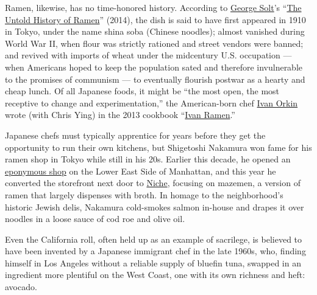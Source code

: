 Ramen, likewise, has no time-honored history. According to
\href{https://www.nytimes3xbfgragh.onion/2014/04/30/dining/an-indie-spirits-shop-a-history-book-on-ramen-real-baby-carrots-and-more.html}{George
Solt}'s
``\href{https://www.ucpress.edu/book/9780520282353/the-untold-history-of-ramen}{The
Untold History of Ramen}'' (2014), the dish is said to have first
appeared in 1910 in Tokyo, under the name shina soba (Chinese noodles);
almost vanished during World War II, when flour was strictly rationed
and street vendors were banned; and revived with imports of wheat under
the midcentury U.S. occupation --- when Americans hoped to keep the
population sated and therefore invulnerable to the promises of communism
--- to eventually flourish postwar as a hearty and cheap lunch. Of all
Japanese foods, it might be ``the most open, the most receptive to
change and experimentation,'' the American-born chef
\href{https://www.nytimes3xbfgragh.onion/2013/12/18/dining/a-life-of-noodles-comes-full-circle.html}{Ivan
Orkin} wrote (with Chris Ying) in the 2013 cookbook
``\href{https://www.penguinrandomhouse.com/books/222246/ivan-ramen-by-ivan-orkin-with-chris-ying-foreword-by-david-chang/9781607744467/}{Ivan
Ramen}.''

Japanese chefs must typically apprentice for years before they get the
opportunity to run their own kitchens, but Shigetoshi Nakamura won fame
for his ramen shop in Tokyo while still in his 20s. Earlier this decade,
he opened an \href{http://www.nakamuranyc.com/}{eponymous shop} on the
Lower East Side of Manhattan, and this year he converted the storefront
next door to \href{http://www.nakamuranyc.com/niche}{Niche}, focusing on
mazemen, a version of ramen that largely dispenses with broth. In homage
to the neighborhood's historic Jewish delis, Nakamura cold-smokes salmon
in-house and drapes it over noodles in a loose sauce of cod roe and
olive oil.

Even the California roll, often held up as an example of sacrilege, is
believed to have been invented by a Japanese immigrant chef in the late
1960s, who, finding himself in Los Angeles without a reliable supply of
bluefin tuna, swapped in an ingredient more plentiful on the West Coast,
one with its own richness and heft: avocado.

